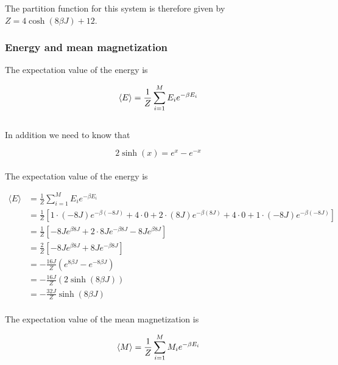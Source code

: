 \documentclass{article}
\begin{document}
The partition function for this system is therefore given by $Z = 4 \cosh(8 \beta J) + 12$.

\subsubsection{Energy and mean magnetization}

The expectation value of the energy is

\begin{equation}    \label{eq:expectationenergy}
    \langle E \rangle = \frac{1}{Z} \sum _{i=1} ^M E_i e^{- \beta E_i} \\
\end{equation} \\

In addition we need to know that

\begin{equation*}
    2 \sinh (x) = e^x - e^{-x}
\end{equation*} \\

The expectation value of the energy is

\begin{align*}
  \langle E \rangle &= \frac{1}{Z} \sum _{i=1} ^M E_i e^{- \beta E_i} \\
  &= \frac{1}{Z} \left[ 1 \cdot (-8J) e^{- \beta (-8J)} + 4 \cdot 0 + 2 \cdot (8J) e^{- \beta (8J)} + 4 \cdot 0 + 1 \cdot (-8J) e^{- \beta (-8J)} \right] \\
  &= \frac{1}{Z} \left[ - 8J e^{\beta 8J} + 2 \cdot 8J e^{- \beta 8J} - 8J e^{ \beta 8J} \right] \\
  &= \frac{2}{Z} \left[ - 8J e^{\beta 8 J} + 8 J e^{- \beta 8 J} \right] \\
  &= - \frac{16 J}{Z} \left( e^{8 \beta J} - e^{- 8 \beta J} \right) \\
  &= - \frac{16 J}{Z} (2 \sinh(8 \beta J) ) \\
  &= - \frac{32 J}{Z} \sinh(8 \beta J)
\end{align*} \\

The expectation value of the mean magnetization is

\begin{equation}    \label{eq:meanmagnetization}
    \langle M \rangle = \frac{1}{Z} \sum _{i=1} ^M M_i e^{- \beta E_i} \\
\end{equation} \\
\end{document}

